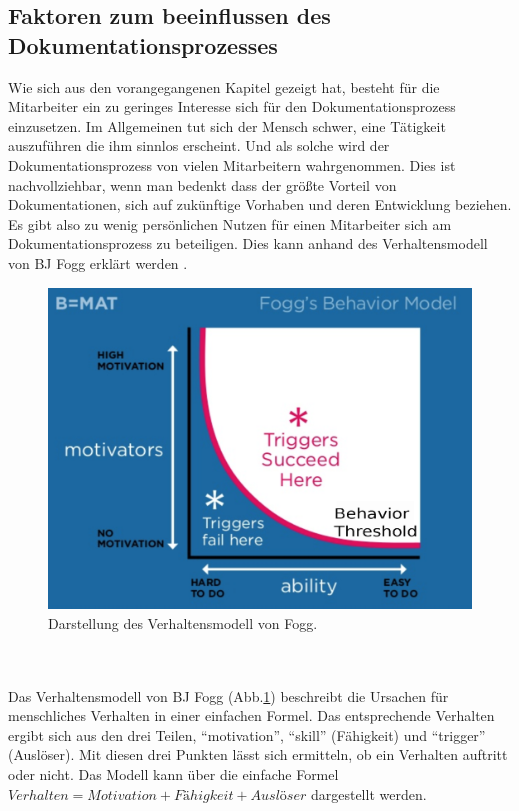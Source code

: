 \documentclass[a4paper,12pt]{scrartcl}
\begin{document}
\subsection{Faktoren zum beeinflussen des Dokumentationsprozesses}
Wie sich aus den vorangegangenen Kapitel gezeigt hat, besteht für die Mitarbeiter ein zu geringes Interesse sich für den Dokumentationsprozess einzusetzen. Im Allgemeinen tut sich der Mensch schwer, eine Tätigkeit auszuführen die ihm sinnlos erscheint. Und als solche wird der Dokumentationsprozess von vielen Mitarbeitern wahrgenommen. Dies ist nachvollziehbar, wenn man bedenkt dass der größte Vorteil von Dokumentationen, sich auf zukünftige Vorhaben und deren Entwicklung beziehen. Es gibt also zu wenig persönlichen Nutzen für einen Mitarbeiter sich am Dokumentationsprozess zu beteiligen. Dies kann anhand des Verhaltensmodell von BJ Fogg erklärt werden \cite{Verhaltensmodell2018}.
\begin{figure}[h!]
\begin{center}
\includegraphics[scale = 0.6]{Bilder/Verhaltensmodell.eps}
\caption{Darstellung des Verhaltensmodell von Fogg\cite{Verhaltensmodell2018}.}
\label{VerhaltensmodellBild}
\end{center}
\end{figure}
\\\\
Das Verhaltensmodell von BJ Fogg (Abb.\ref{VerhaltensmodellBild}) beschreibt die Ursachen für menschliches Verhalten in einer einfachen Formel. Das entsprechende Verhalten ergibt sich aus den drei Teilen, \enquote{motivation}, \enquote{skill} (Fähigkeit) und \enquote{trigger} (Auslöser). Mit diesen drei Punkten lässt sich ermitteln, ob ein Verhalten auftritt oder nicht. Das Modell kann über die einfache Formel \( Verhalten = Motivation + Fähigkeit + Auslöser \) dargestellt werden.
\end{document}
